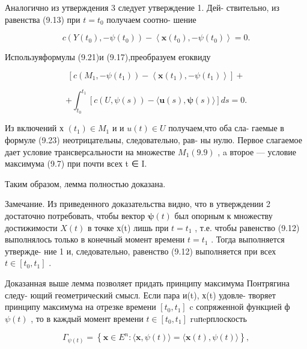 \documentclass[8pt]{extarticle}
\begin{document}
Аналогично из утверждения 3 следует утверждение 1. Дей- ствительно, из равенства (9.13) при \(t = {t}_{0}\) получаем соотно- шение

\[
c\left( {Y\left( {t}_{0}\right) , - \psi \left( {t}_{0}\right) }\right)  - \left\langle  {\mathbf{x}\left( {t}_{0}\right) , - \psi \left( {t}_{0}\right) }\right\rangle   = 0.
\]

Используяформулы (9.21)и (9.17),преобразуем егоквиду

\[
\left\lbrack  {c\left( {{M}_{1}, - \psi \left( {t}_{1}\right) }\right)  - \left\langle  {\mathbf{x}\left( {t}_{1}\right) , - \psi \left( {t}_{1}\right) }\right\rangle  }\right\rbrack   +
\]

\[
+ {\int }_{{t}_{0}}^{{t}_{1}}\left\lbrack  {c\left( {U,\psi \left( s\right) }\right) -\langle \mathbf{u}\left( s\right) ,\mathbf{\psi }\left( s\right) \rangle }\right\rbrack  {ds} = 0. \tag{9.23}
\]

Из включений х \(\left( {t}_{1}\right)  \in  {M}_{1}\) и и \(u\left( t\right)  \in  U\) получаем,что оба сла- гаемые в формуле (9.23) неотрицательны, следовательно, рав- ны нулю. Первое слагаемое дает условие трансверсальности на множестве \({M}_{1}\left( {9.9}\right)\) , a второе — условие максимума (9.7) при почти всех t ∈ I.

Таким образом, лемма полностью доказана.

Замечание. Из приведенного доказательства видно, что в утверждении 2 достаточно потребовать, чтобы вектор \(\mathbf{\psi }\left( t\right)\) был опорным к множеству достижимости \(X\left( t\right)\) в точке х(t) лишь при \(t = {t}_{1}\) , т.е. чтобы равенство (9.12) выполнялось только в конечный момент времени \(t = {t}_{1}\) . Тогда выполняется утвержде- ние 1 и, следовательно, равенство (9.12) выполняется при всех \(t \in  \left\lbrack  {{t}_{0},{t}_{1}}\right\rbrack\) .

Доказанная выше лемма позволяет придать принципу максимума Понтрягина следу- ющий геометрический смысл. Если пара и(t), х(t) удовле- творяет принципу максимума на отрезке времени \(\left\lbrack  {{t}_{0},{t}_{1}}\right\rbrack\) c сопряженной функцией ф \(\psi \left( t\right)\) , то в каждый момент времени \(t \in  \left\lbrack  {{t}_{0},{t}_{1}}\right\rbrack\) ruпeрплоскость

\[
{\Gamma }_{\psi \left( t\right) } = \left\{  {\mathbf{x} \in  {E}^{n} : \langle \mathbf{x},\psi \left( t\right) \rangle  = \langle \mathbf{x}\left( t\right) ,\psi \left( t\right) \rangle }\right\}  ,
\]
\end{document}
